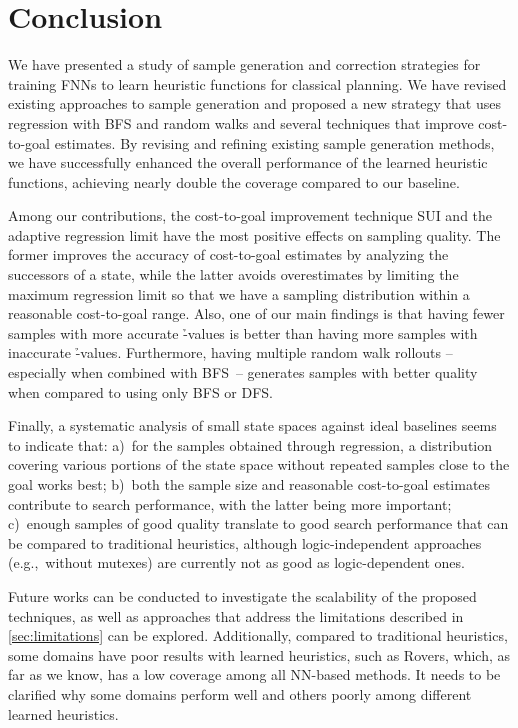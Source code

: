\chapter{Conclusion}
\label{sec:conclusion}

We have presented a study of sample generation and correction strategies for training FNNs to learn heuristic functions for classical planning. We have revised existing approaches to sample generation and proposed a new strategy that uses regression with BFS and random walks and several techniques that improve cost-to-goal estimates. By revising and refining existing sample generation methods, we have successfully enhanced the overall performance of the learned heuristic functions, achieving nearly double the coverage compared to our baseline.

Among our contributions, the cost-to-goal improvement technique SUI and the adaptive regression limit \meanfx have the most positive effects on sampling quality. The former improves the accuracy of cost-to-goal estimates by analyzing the successors of a state, while the latter avoids overestimates by limiting the maximum regression limit so that we have a sampling distribution within a reasonable cost-to-goal range. Also, one of our main findings is that having fewer samples with more accurate \h-values is better than having more samples with inaccurate \h-values. Furthermore, having multiple random walk rollouts -- especially when combined with BFS~-- generates samples with better quality when compared to using only BFS or DFS.

Finally, a systematic analysis of small state spaces against ideal baselines seems to indicate that: a)~for the samples obtained through regression, a distribution covering various portions of the state space without repeated samples close to the goal works best; b)~both the sample size and reasonable cost-to-goal estimates contribute to search performance, with the latter being more important; c)~enough samples of good quality translate to good search performance that can be compared to traditional heuristics, although logic-independent approaches (e.g.,~without mutexes) are currently not as good as logic-dependent ones.

Future works can be conducted to investigate the scalability of the proposed techniques, as well as approaches that address the limitations described in \cref{sec:limitations} can be explored. Additionally, compared to traditional heuristics, some domains have poor results with learned heuristics, such as Rovers, which, as far as we know, has a low coverage among all NN-based methods. It needs to be clarified why some domains perform well and others poorly among different learned heuristics.


